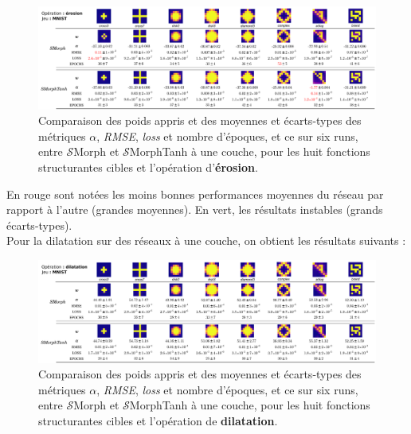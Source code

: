 \vspace{4.0mm}
\begin{figure}[ht]
  \begin{center}
    \includegraphics[width=1.00\textwidth]{parts/3-contributions/A-reseaux_smorphTANH/figures/t_erosion_mnist.pdf}
    \vspace{-2.0mm}
    \caption{ \centering Comparaison des poids appris et des moyennes et écarts-types des métriques $\alpha$, \textit{RMSE}, \textit{loss} et nombre d'époques, et ce sur six runs, entre $\mathcal{S}$Morph et $\mathcal{S}$MorphTanh à une couche, pour les huit fonctions structurantes cibles et l'opération d'\textbf{érosion}.}
    \label{fig:SMvsSMTH_erosion_mnist}
  \end{center}
\end{figure}


\newpage

\noindent En rouge sont notées les moins bonnes performances moyennes du réseau par rapport à l'autre (grandes moyennes). En vert, les résultats instables (grands écarts-types). \\

\vspace{2mm}
Pour la dilatation sur des réseaux à une couche, on obtient les résultats suivants : \\

\vspace{2.5mm}
\begin{figure}[ht]
  \begin{center}
    \includegraphics[width=1.00\textwidth]{parts/3-contributions/A-reseaux_smorphTANH/figures/t_dilation_mnist.pdf}
    \vspace{-2.0mm}
    \caption{ \centering Comparaison des poids appris et des moyennes et écarts-types des métriques $\alpha$, \textit{RMSE}, \textit{loss} et nombre d'époques, et ce sur six runs, entre $\mathcal{S}$Morph et $\mathcal{S}$MorphTanh à une couche, pour les huit fonctions structurantes cibles et l'opération de \textbf{dilatation}.}
    \label{fig:SMvsSMTH_dilation_mnist}
  \end{center}
\end{figure}


